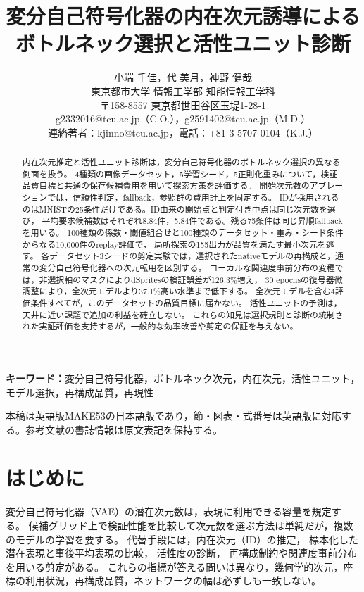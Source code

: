 \documentclass[11pt,a4paper]{ltjsarticle}
\title{変分自己符号化器の内在次元誘導による\\ボトルネック選択と活性ユニット診断}
\author{小端 千佳，代 美月，神野 健哉\\
東京都市大学 情報工学部 知能情報工学科\\
{\small 〒158-8557 東京都世田谷区玉堤1-28-1}\\
{\small g2332016@tcu.ac.jp（C.O.），g2591402@tcu.ac.jp（M.D.）}\\
{\small 連絡著者：kjinno@tcu.ac.jp，電話：+81-3-5707-0104（K.J.）}}
\date{}
\begin{document}
\maketitle
\begin{abstract}
内在次元推定と活性ユニット診断は，変分自己符号化器のボトルネック選択の異なる側面を扱う。
4種類の画像データセット，5学習シード，5正則化重みについて，検証品質目標と共通の保存候補費用を用いて探索方策を評価する。
開始次元数のアブレーションでは，信頼性判定，fallback，参照群の費用計上を固定する。
IDが採用されるのはMNISTの25条件だけである。ID由来の開始点と判定付き中点は同じ次元数を選び，
平均要求候補数はそれぞれ8.84件，5.84件である。残る75条件は同じ昇順fallbackを用いる。
100種類の係数・閾値組合せと100種類のデータセット・重み・シード条件からなる10,000件のreplay評価で，
局所探索の155出力が品質を満たす最小次元を逃す。
各データセット3シードの剪定実験では，選択されたnativeモデルの再構成と，通常の変分自己符号化器への次元転用を区別する。
ローカルな関連度事前分布の変種では，非選択軸のマスクによりdSpritesの検証誤差が126.3\%増え，
30 epochsの復号器微調整により，全次元モデルより37.1\%高い水準まで低下する。
全次元モデルを含む4評価条件すべてが，このデータセットの品質目標に届かない。
活性ユニットの予測は，天井に近い課題で追加の利益を確立しない。
これらの知見は選択規則と診断の統制された実証評価を支持するが，一般的な効率改善や剪定の保証を与えない。
\end{abstract}
\noindent\textbf{キーワード：}変分自己符号化器，ボトルネック次元，内在次元，活性ユニット，モデル選択，再構成品質，再現性
\par\smallskip
{\small 本稿は英語版MAKE53の日本語版であり，節・図表・式番号は英語版に対応する。参考文献の書誌情報は原文表記を保持する。}
\par\medskip
\section{はじめに}\label{sec:intro}

変分自己符号化器（VAE）\cite{kingma2014vae}の潜在次元数は，表現に利用できる容量を規定する。
候補グリッド上で検証性能を比較して次元数を選ぶ方法は単純だが，複数のモデルの学習を要する。
代替手段には，内在次元（ID）の推定\cite{facco2017twonn,levina2005mle}，
標本化した潜在表現と事後平均表現の比較\cite{bonheme2022fondue}，
活性度の診断\cite{burda2016iwae,bonheme2023active}，
再構成制約や関連度事前分布を用いる剪定\cite{deboom2020geco,saha2025ardvae}がある。
これらの指標が答える問いは異なり，幾何学的次元，座標の利用状況，再構成品質，ネットワークの幅は必ずしも一致しない。
\end{document}

